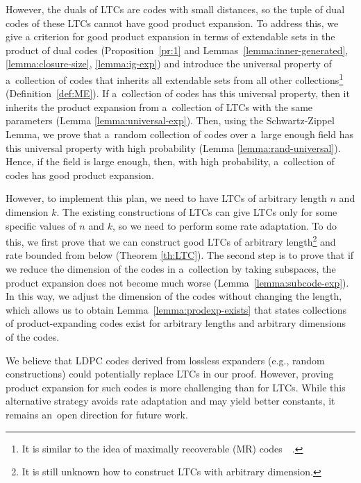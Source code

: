 \documentclass[conference]{IEEEtran}
\theoremstyle{plain}
\theoremstyle{definition}
\theoremstyle{remark}
\begin{document}
However, the duals of LTCs are codes with small distances, so the tuple of dual codes of these LTCs cannot have good product expansion. To address this, we give a criterion for good product expansion in terms of extendable sets in the product of dual codes (Proposition~\ref{pr:1} and Lemmas~\ref{lemma:inner-generated}, \ref{lemma:closure-size}, \ref{lemma:ig-exp}) and introduce the universal property of a~collection of codes that inherits all extendable sets from all other collections\footnote{It is similar to the idea of maximally recoverable (MR) codes~~\cite{chenMaximallyRecoverableProperty2007, gopalanExplicitMaximallyRecoverable2014}.} (Definition~\ref{def:ME}).
If a~collection of codes has this universal property, then it inherits the product expansion from a~collection of LTCs with the same parameters (Lemma \ref{lemma:universal-exp}).
Then, using the Schwartz-Zippel Lemma, we prove that a~random collection of codes over a~large enough field has this universal property with high probability (Lemma \ref{lemma:rand-universal}). 
Hence, if the field is large enough, then, with high probability, a~collection of codes has good product expansion.

However, to implement this plan, we need to have LTCs of arbitrary length $n$ and dimension $k$. The existing constructions of LTCs \cite{Dinur:stoc2022,Panteleev&Kalachev:stoc2022,Leverrier:focs2022,Lin2022:losslessLTC} can give LTCs only for some specific values of $n$ and $k$, so we need to perform some rate adaptation. To do this, we first prove that we can construct good LTCs of arbitrary length\footnote{It is still unknown how to construct LTCs with arbitrary dimension.} and rate bounded from below (Theorem \ref{th:LTC}). 
The second step is to prove that if we reduce the dimension of the codes in a~collection by taking subspaces, the product expansion does not become much worse (Lemma~\ref{lemma:subcode-exp}). In this way, we adjust the dimension of the codes without changing the length, which allows us to obtain Lemma~\ref{lemma:prodexp-exists} that states collections of product-expanding codes exist for arbitrary lengths and arbitrary dimensions of the codes.


We believe that LDPC codes derived from lossless expanders (e.g., random constructions) could potentially replace LTCs in our proof. However, proving product expansion for such codes is more challenging than for LTCs. While this alternative strategy avoids rate adaptation and may yield better constants, it remains an~open direction for future work.
\end{document}
